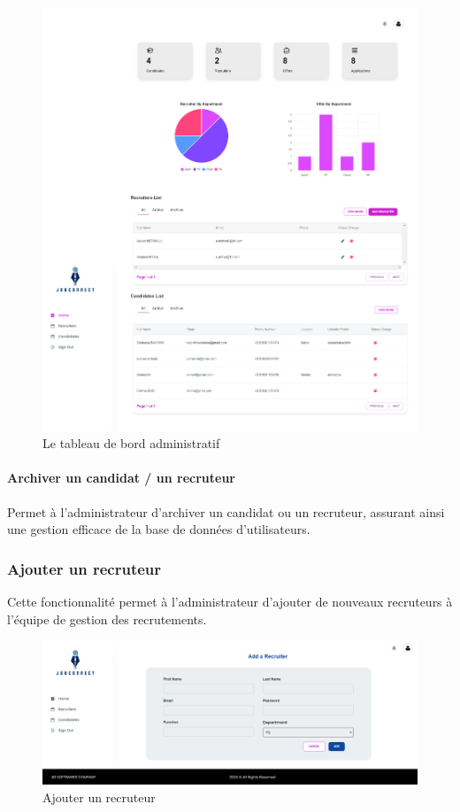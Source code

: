 \begin{figure}[htbp]
   \centering
   \includegraphics[scale=0.2]{screens/dashboardAdmin.png} 
   \caption{Le tableau de bord administratif}
   \label{fig:scheduleIcon}
\end{figure}

\paragraph*{Archiver un candidat / un recruteur}

Permet à l'administrateur d'archiver un candidat ou un recruteur, assurant ainsi une gestion efficace de la base de données d'utilisateurs.


\subsubsection{Ajouter un recruteur}

Cette fonctionnalité permet à l'administrateur d'ajouter de nouveaux recruteurs à l'équipe de gestion des recrutements.
\begin{figure}[htbp]
   \centering
   \includegraphics[scale=0.2]{screens/addRec.png} 
   \caption{Ajouter un recruteur}
   \label{fig:scheduleIcon}
\end{figure}





